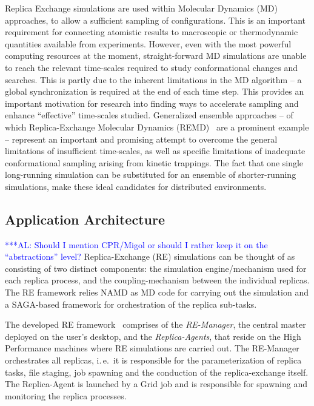 \documentclass[conference,final]{IEEEtran}
\newcommand{\alnote}[1]{ {\textcolor{blue} { ***AL: #1 }}}
\newcommand{\alnote}[1]{}
\begin{document}
Replica Exchange simulations are used within Molecular Dynamics (MD)
approaches, to allow a sufficient sampling of configurations. This is
an important requirement for connecting atomistic results to
macroscopic or thermodynamic quantities available from experiments.
However, even with the most powerful computing resources at the
moment, straight-forward MD simulations are unable to reach the
relevant time-scales required to study conformational changes and
searches. This is partly due to the inherent limitations in the MD
algorithm -- a global synchronization is required at the end of each
time step.  This provides an important motivation for research into
finding ways to accelerate sampling and enhance ``effective''
time-scales studied. Generalized ensemble approaches -- of which
Replica-Exchange Molecular Dynamics (REMD)~\cite{Sugita:1999rm} are a
prominent example -- represent an important and promising attempt to
overcome the general limitations of insufficient time-scales, as well
as specific limitations of inadequate conformational sampling arising
from kinetic trappings.  The fact that one single long-running
simulation can be substituted for an ensemble of shorter-running
simulations, make these ideal candidates for distributed environments.

\subsection{Application Architecture}
\alnote{Should I mention CPR/Migol or should I rather keep it on the 
``abstractions'' level?}
Replica-Exchange (RE) simulations can be thought of as consisting of
two distinct components: the  simulation engine/mechanism
used for each replica process, and the coupling-mechanism between the
individual replicas. The RE framework relies NAMD as MD code for 
carrying out the simulation and a SAGA-based framework 
for orchestration of the replica sub-tasks. 

The developed RE framework~\cite{Luckow:2008la} comprises of the
\emph{RE-Manager}, the central master deployed on the user's desktop,
and the \textit{Replica-Agents}, that reside on the High Performance
machines where RE simulations are carried out. The RE-Manager
orchestrates all replicas, i.\,e.\ it is responsible for the
parameterization of replica tasks, file staging, job spawning and the
conduction of the replica-exchange itself.  The Replica-Agent is
launched by a Grid job and is responsible for spawning and monitoring
the replica processes.
\end{document}
